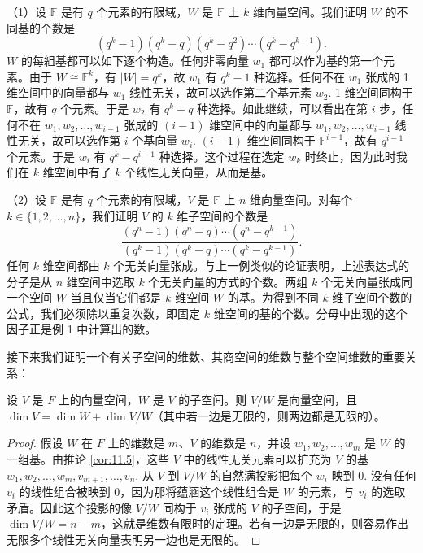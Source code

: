 \begin{example}
（1）设 \(\mathbb{F}\) 是有 \(q\) 个元素的有限域，\(W\) 是 \(\mathbb{F}\) 上 \(k\) 维向量空间。我们证明 \(W\) 的不同基的个数是
\[
(q^k-1)(q^k-q)(q^k-q^2)\cdots(q^k-q^{k-1}).
\]
\(W\) 的每組基都可以如下逐个构造。任何非零向量 \(w_1\) 都可以作为基的第一个元素。由于 \(W \cong \mathbb{F}^k\)，有 \(|W| = q^k\)，故 \(w_1\) 有 \(q^k-1\) 种选择。任何不在 \(w_1\) 张成的 1 维空间中的向量都与 \(w_1\) 线性无关，故可以选作第二个基元素 \(w_2\). 1 维空间同构于 \(\mathbb{F}\)，故有 \(q\) 个元素。于是 \(w_2\) 有 \(q^k-q\) 种选择。如此继续，可以看出在第 \(i\) 步，任何不在 \(w_1, w_2, \ldots, w_{i-1}\) 张成的 \((i-1)\) 维空间中的向量都与 \(w_1, w_2, \ldots, w_{i-1}\) 线性无关，故可以选作第 \(i\) 个基向量 \(w_i\). \((i-1)\) 维空间同构于 \(\mathbb{F}^{i-1}\)，故有 \(q^{i-1}\) 个元素。于是 \(w_i\) 有 \(q^k-q^{i-1}\) 种选择。这个过程在选定 \(w_k\) 时终止，因为此时我们在 \(k\) 维空间中有了 \(k\) 个线性无关向量，从而是基。

（2）设 \(\mathbb{F}\) 是有 \(q\) 个元素的有限域，\(V\) 是 \(\mathbb{F}\) 上 \(n\) 维向量空间。对每个 \(k \in \{1, 2, \ldots, n\}\)，我们证明 \(V\) 的 \(k\) 维子空间的个数是
\[
\frac{(q^n-1)(q^n-q)\cdots(q^n-q^{k-1})}{(q^k-1)(q^k-q)\cdots(q^k-q^{k-1})}.
\]
任何 \(k\) 维空间都由 \(k\) 个无关向量张成。与上一例类似的论证表明，上述表达式的分子是从 \(n\) 维空间中选取 \(k\) 个无关向量的方式的个数。两组 \(k\) 个无关向量张成同一个空间 \(W\) 当且仅当它们都是 \(k\) 维空间 \(W\) 的基。为得到不同 \(k\) 维子空间个数的公式，我们必须除以重复次数，即固定 \(k\) 维空间的基的个数。分母中出现的这个因子正是例 1 中计算出的数。
\end{example}

接下来我们证明一个有关子空间的维数、其商空间的维数与整个空间维数的重要关系：

\begin{theorem}\label{thm:11.7}
设 \(V\) 是 \(F\) 上的向量空间，\(W\) 是 \(V\) 的子空间。则 \(V/W\) 是向量空间，且 \(\dim V = \dim W+\dim V/W\)（其中若一边是无限的，则两边都是无限的）。
\end{theorem}

\begin{proof}
假设 \(W\) 在 \(F\) 上的维数是 \(m\)、\(V\) 的维数是 \(n\)，并设 \(w_1, w_2, \ldots, w_m\) 是 \(W\) 的一组基。由推论 \ref{cor:11.5}，这些 \(V\) 中的线性无关元素可以扩充为 \(V\) 的基 \(w_1, w_2, \ldots, w_m, v_{m+1}, \ldots, v_n\). 从 \(V\) 到 \(V/W\) 的自然满投影把每个 \(w_i\) 映到 0. 没有任何 \(v_i\) 的线性组合被映到 0，因为那将蕴涵这个线性组合是 \(W\) 的元素，与 \(v_i\) 的选取矛盾。因此这个投影的像 \(V/W\) 同构于 \(v_i\) 张成的 \(V\) 的子空间，于是 \(\dim V/W = n-m\)，这就是维数有限时的定理。若有一边是无限的，则容易作出无限多个线性无关向量表明另一边也是无限的。
\end{proof}

